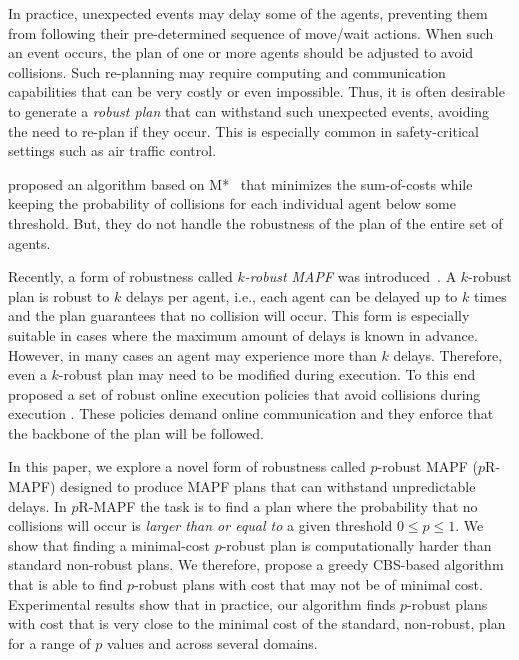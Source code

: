 \documentclass{article}
\newcommand{\prmapf}{$p$R-MAPF\xspace}
\newcommand\Roni[1]{\nb{\textbf{Roni:}}{orange}{#1}}
\newcommand{\inlinecite}[1]{\citeauthor{#1} \shortcite{#1}}
\begin{document}
In practice, unexpected events may delay some of the agents, preventing them from following their pre-determined sequence of move/wait actions. When such an event occurs, the plan of one or more agents should be adjusted to avoid collisions. Such re-planning  may require computing and communication capabilities that can be very costly or even impossible. 
Thus, it is often desirable to generate a {\em robust plan} that can withstand such unexpected events, avoiding the need to re-plan if they occur. This is especially common in safety-critical settings such as air traffic control.

\inlinecite{wagner2017path} proposed an algorithm based on M*~\cite{wagner2015subdimensional} that minimizes the sum-of-costs while keeping the probability of collisions for each individual agent below some threshold.  But, they do not handle the robustness of the plan of the entire set of agents. 



Recently, a form of robustness called \emph{$k$-robust MAPF} was introduced~\cite{DBLP:conf/socs/AtzmonSFWBZ18}. A $k$-robust plan is robust to $k$ delays per agent, i.e., each agent can be delayed up to $k$ times and the plan guarantees that no collision will occur. This form is especially suitable in cases where the maximum amount of delays is known in advance. However, in many cases an agent may experience more than $k$ delays. Therefore, even a $k$-robust plan may need to be modified during execution. To this end~\cite{ma2017multiAgent} proposed a set of robust online execution policies that avoid collisions during execution . These policies demand online communication and they enforce that the backbone of the plan will be followed. 

In this paper, we explore a novel form of robustness called $p$-robust MAPF (\prmapf{}) designed to produce MAPF plans that can withstand 
unpredictable delays.  In \prmapf{} the task is to find a plan where the probability that no collisions will occur is {\em larger than or equal to} a given threshold $0 \leq p \leq 1$. We show that  finding a minimal-cost $p$-robust plan is computationally harder than standard non-robust plans. %
We therefore, propose a greedy CBS-based algorithm that is able to find $p$-robust plans with cost that may not be of minimal cost. Experimental results show that in practice, our algorithm finds $p$-robust plans with cost that is very close to the minimal cost of the standard, non-robust, plan for a range of $p$ values and across several domains. 
\end{document}
